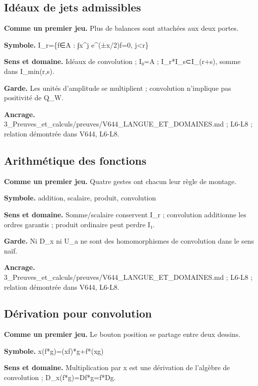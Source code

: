 \documentclass[
  9pt,
  a4paper,
]{article}
\begin{document}
\hypertarget{iduxe9aux-de-jets-admissibles}{%
\subsection{Idéaux de jets
admissibles}\label{iduxe9aux-de-jets-admissibles}}

\textbf{Comme un premier jeu.} Plus de balances sont attachées aux deux
portes.

\textbf{Symbole.} I\_r=\{f∈A : ∫x\^{}j e\^{}(±x/2)f=0, j\textless r\}

\textbf{Sens et domaine.} Idéaux de convolution ; I₀=A ;
I\_r*I\_s⊂I\_(r+s), somme dans I\_min(r,s).

\textbf{Garde.} Les unités d'amplitude se multiplient ; convolution
n'implique pas positivité de Q\_W.

\textbf{Ancrage.}
3\_Preuves\_et\_calculs/preuves/V644\_LANGUE\_ET\_DOMAINES.md ; L6-L8 ;
relation démontrée dans V644, L6-L8.

\hypertarget{arithmuxe9tique-des-fonctions}{%
\subsection{Arithmétique des
fonctions}\label{arithmuxe9tique-des-fonctions}}

\textbf{Comme un premier jeu.} Quatre gestes ont chacun leur règle de
montage.

\textbf{Symbole.} addition, scalaire, produit, convolution

\textbf{Sens et domaine.} Somme/scalaire conservent I\_r ; convolution
additionne les ordres garantis ; produit ordinaire peut perdre I₁.

\textbf{Garde.} Ni D\_x ni U\_a ne sont des homomorphismes de
convolution dans le sens naïf.

\textbf{Ancrage.}
3\_Preuves\_et\_calculs/preuves/V644\_LANGUE\_ET\_DOMAINES.md ; L6-L8 ;
relation démontrée dans V644, L6-L8.

\hypertarget{duxe9rivation-pour-convolution}{%
\subsection{Dérivation pour
convolution}\label{duxe9rivation-pour-convolution}}

\textbf{Comme un premier jeu.} Le bouton position se partage entre deux
dessins.

\textbf{Symbole.} x(f*g)=(xf)*g+f*(xg)

\textbf{Sens et domaine.} Multiplication par x est une dérivation de
l'algèbre de convolution ; D\_x(f*g)=Df*g=f*Dg.
\end{document}
